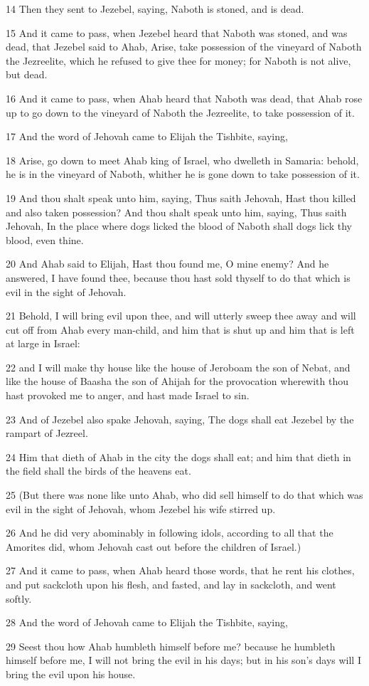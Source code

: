 \par 14 Then they sent to Jezebel, saying, Naboth is stoned, and is dead.
\par 15 And it came to pass, when Jezebel heard that Naboth was stoned, and was dead, that Jezebel said to Ahab, Arise, take possession of the vineyard of Naboth the Jezreelite, which he refused to give thee for money; for Naboth is not alive, but dead.
\par 16 And it came to pass, when Ahab heard that Naboth was dead, that Ahab rose up to go down to the vineyard of Naboth the Jezreelite, to take possession of it.
\par 17 And the word of Jehovah came to Elijah the Tishbite, saying,
\par 18 Arise, go down to meet Ahab king of Israel, who dwelleth in Samaria: behold, he is in the vineyard of Naboth, whither he is gone down to take possession of it.
\par 19 And thou shalt speak unto him, saying, Thus saith Jehovah, Hast thou killed and also taken possession? And thou shalt speak unto him, saying, Thus saith Jehovah, In the place where dogs licked the blood of Naboth shall dogs lick thy blood, even thine.
\par 20 And Ahab said to Elijah, Hast thou found me, O mine enemy? And he answered, I have found thee, because thou hast sold thyself to do that which is evil in the sight of Jehovah.
\par 21 Behold, I will bring evil upon thee, and will utterly sweep thee away and will cut off from Ahab every man-child, and him that is shut up and him that is left at large in Israel:
\par 22 and I will make thy house like the house of Jeroboam the son of Nebat, and like the house of Baasha the son of Ahijah for the provocation wherewith thou hast provoked me to anger, and hast made Israel to sin.
\par 23 And of Jezebel also spake Jehovah, saying, The dogs shall eat Jezebel by the rampart of Jezreel.
\par 24 Him that dieth of Ahab in the city the dogs shall eat; and him that dieth in the field shall the birds of the heavens eat.
\par 25 (But there was none like unto Ahab, who did sell himself to do that which was evil in the sight of Jehovah, whom Jezebel his wife stirred up.
\par 26 And he did very abominably in following idols, according to all that the Amorites did, whom Jehovah cast out before the children of Israel.)
\par 27 And it came to pass, when Ahab heard those words, that he rent his clothes, and put sackcloth upon his flesh, and fasted, and lay in sackcloth, and went softly.
\par 28 And the word of Jehovah came to Elijah the Tishbite, saying,
\par 29 Seest thou how Ahab humbleth himself before me? because he humbleth himself before me, I will not bring the evil in his days; but in his son's days will I bring the evil upon his house.

